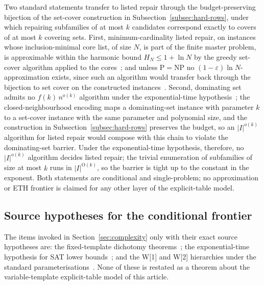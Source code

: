 \documentclass[11pt]{article}
\theoremstyle{plain}
\theoremstyle{definition}
\theoremstyle{remark}
\newcommand{\eps}{\varepsilon}
\begin{document}
Two standard statements transfer to listed repair through the
budget-preserving bijection of the set-cover construction in
Subsection~\ref{subsec:hard-rows}, under which repairing subfamilies of at
most \(k\) candidates correspond exactly to covers of at most \(k\)
covering sets.  First, minimum-cardinality listed repair, on instances whose
inclusion-minimal core list, of size \(N\), is part of the finite master
problem, is approximable within the harmonic bound \(H_N\le1+\ln N\) by the
greedy set-cover algorithm applied to the cores~\cite{johnson74}; and unless
\(\mathrm P=\mathrm{NP}\) no \((1-\eps)\ln N\)-approximation exists, since
such an algorithm would transfer back through the bijection to set cover on
the constructed instances~\cite{dinursteurer14}.  Second, dominating set
admits no \(f(k)\,n^{o(k)}\) algorithm under the exponential-time
hypothesis~\cite{impagliazzo-paturi01,cygan15}; the closed-neighbourhood
encoding maps a dominating-set instance with parameter \(k\) to a set-cover
instance with the same parameter and polynomial size, and the construction
in Subsection~\ref{subsec:hard-rows} preserves the budget, so an
\(|I|^{o(k)}\) algorithm for listed repair would compose with this chain to
violate the dominating-set barrier.  Under the exponential-time hypothesis,
therefore, no \(|I|^{o(k)}\) algorithm decides listed repair; the trivial
enumeration of subfamilies of size at most \(k\) runs in
\(|I|^{\mathrm O(k)}\), so the barrier is tight up to the constant in the
exponent.  Both statements are conditional and single-problem; no
approximation or ETH frontier is claimed for any other layer of the
explicit-table model.

\subsection{Source hypotheses for the conditional frontier}

The items invoked in Section~\ref{sec:complexity} only with their exact
source hypotheses are: the fixed-template dichotomy
theorems~\cite{schaefer78,zhuk17}; the exponential-time hypothesis for SAT
lower bounds~\cite{impagliazzo-paturi01}; and the W[1] and W[2] hierarchies
under the standard parameterisations~\cite{downey-fellows99}.  None of these
is restated as a theorem about the variable-template explicit-table model of
this article.
\end{document}
